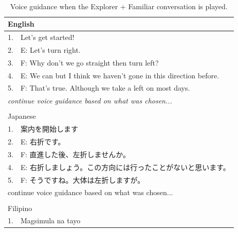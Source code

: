 \begin{table}[h]
\centering
\caption{Voice guidance when the Explorer + Familiar conversation is played.}~\label{tab:b-EF}
\begin{tabular}{ll}
\hline
\multicolumn{2}{l}{English}                                                      \\ \hline
1.                       & Let's get started!                                    \\ \hline
\multicolumn{1}{|l}{2.}  & \multicolumn{1}{l|}{E: Let's turn right.}             \\
\multicolumn{1}{|l}{3.} & \multicolumn{1}{l|}{F: Why don't we go straight then turn left?}                         \\
\multicolumn{1}{|l}{4.} & \multicolumn{1}{l|}{E: We can but I think we haven't gone in this direction before.}     \\
\multicolumn{1}{|l}{5.} & \multicolumn{1}{l|}{F: That's true. Although we take a left on most days.}               \\ \hline
\multicolumn{2}{l}{\textit{continue voice guidance based on what was chosen...}} \\
                         &                                                       \\ \hline
\multicolumn{2}{l}{Japanese}                                                     \\ \hline
1.                       & 案内を開始します                                              \\ \hline
\multicolumn{1}{|l}{2.}  & \multicolumn{1}{l|}{E: 右折です。}                         \\
\multicolumn{1}{|l}{3.}  & \multicolumn{1}{l|}{F: 直進した後、左折しませんか。}                \\
\multicolumn{1}{|l}{4.}  & \multicolumn{1}{l|}{E: 右折しましょう。この方向には行ったことがないと思います。}  \\
\multicolumn{1}{|l}{5.}  & \multicolumn{1}{l|}{F: そうですね。大体は左折しますが。}              \\ \hline
\multicolumn{2}{l}{continue voice guidance based on what was chosen...}          \\
                         &                                                       \\ \hline
\multicolumn{2}{l}{Filipino}                                                     \\ \hline
1.                       & Magsimula na tayo                                     \\ \hline

\end{tabular}
\end{table}
